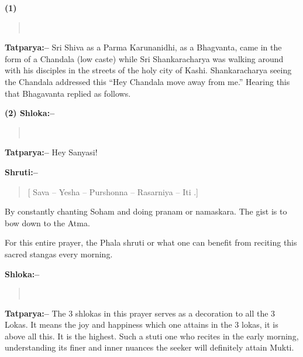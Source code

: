 
\begin{center}
\textbf{}
\end{center}

\textbf{(1) }

\begin{verse}
 \\
\end{verse}

\textbf{Tatparya:–} Sri Shiva as a Parma Karunanidhi, as a Bhagvanta, came in the form of a Chandala (low caste) while Sri Shankaracharya was walking around with his disciples in the streets of the holy city of Kashi. Shankaracharya seeing the Chandala addressed this “Hey Chandala move away from me.” Hearing this that Bhagavanta replied as follows.

\textbf{(2) Shloka:–}

\begin{verse}
 \\
\end{verse}

\textbf{Tatparya:–} Hey Sanyasi!

\textbf{Shruti:–}

\begin{verse}
[ Sava – Yesha – Purshonna – Rasarniya – Iti .]
\end{verse}

By constantly chanting Soham and doing pranam or namaskara. The gist is to bow down to the Atma.

For this entire prayer, the Phala shruti or what one can benefit from reciting this sacred stangas every morning.

\textbf{Shloka:–}

\begin{verse}
 \\
\end{verse}

\textbf{Tatparya:–} The 3 shlokas in this prayer serves as a decoration to all the 3 Lokas. It means the joy and happiness which one attains in the 3 lokas, it is above all this. It is the highest. Such a stuti one who recites in the early morning, understanding its finer and inner nuances the seeker will definitely attain Mukti.

